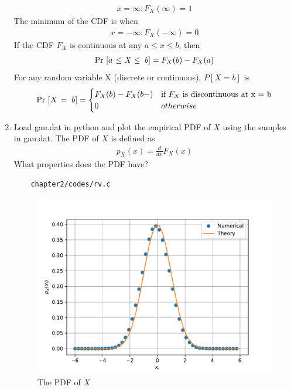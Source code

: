 \begin{enumerate}
\begin{eqnarray}
x = \infty: F_X(\infty) = 1
\end{eqnarray}
The minimum of the CDF is when
\begin{eqnarray}
x = -\infty: F_X(-\infty) = 0	
\end{eqnarray} 
If the CDF $F_X$ is continuous at any
$a \le x \le b$, then
\begin{eqnarray}
\Pr {}\left[a\right. \le X \le {}\left.b\right]  = F_X (b) - F_X (a)
\end{eqnarray}
For any random variable X (discrete or continuous), $P[X = b]$ is
\begin{eqnarray}
\Pr {}\left[X\right. = {}\left.b\right] = 
\begin{cases}
	F_X (b) - F_X (b-) & \text{if $F_X$ is discontinuous at x = b}
	\\	
	0 & otherwise
	\\
	\end{cases}
\end{eqnarray}
\item
Load gau.dat in python and plot the empirical PDF of $X$ using the samples in gau.dat. The PDF of $X$ is defined as
\begin{align}
p_{X}(x) = \frac{d}{dx}F_{X}(x)
\label{eq:cdf_to_pdf}
\end{align}
What properties does the PDF have?
\solution 
\begin{lstlisting}
	chapter2/codes/rv.c
\end{lstlisting}

\begin{figure}[h!]
\centering
\includegraphics[scale=0.8]{chapter2/figs/gauss_pdf.pdf}
\caption{The PDF of $X$}
\label{fig:gauss_pdf}
\end{figure}


\end{enumerate}
